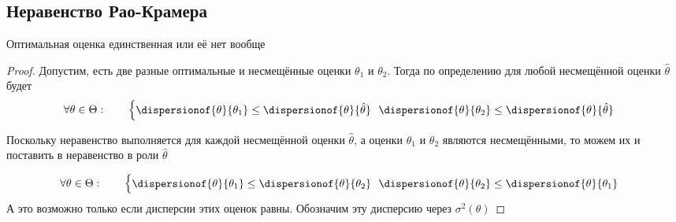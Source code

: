 \subsection{Неравенство Рао-Крамера}
\begin{theorem}
  \label{theorem:Kolmogorov}
  Оптимальная оценка единственная или её нет вообще
\end{theorem}
\begin{proof}
  Допустим,
  есть две разные оптимальные и несмещённые оценки $\theta_1$ и $\theta_2$.
  Тогда по определению для любой несмещённой оценки $\hat{\theta}$ будет
  \begin{align*}
    \forall\theta\in\Theta:\qquad
    \begin{cases}
      \dispersionof{\theta}{\theta_1}
        \le\dispersionof{\theta}{\hat{\theta}}\ \
      \dispersionof{\theta}{\theta_2}
        \le\dispersionof{\theta}{\hat{\theta}}
    \end{cases}
  \end{align*}

  Поскольку неравенство выполняется
  для каждой несмещённой оценки $\hat{\theta}$,
  а оценки $\theta_1$ и $\theta_2$ являются несмещёнными,
  то можем их и поставить в неравенство в роли $\hat{\theta}$

  \begin{align*}
    \forall\theta\in\Theta:\qquad
    \begin{cases}
      \dispersionof{\theta}{\theta_1}
        \le\dispersionof{\theta}{\theta_2}\ \
      \dispersionof{\theta}{\theta_2}
        \le\dispersionof{\theta}{\theta_1}
    \end{cases}
  \end{align*}
  А это возможно только если дисперсии этих оценок равны.
  Обозначим эту дисперсию через $\sigma^2\left(\theta\right)$


\end{proof}
